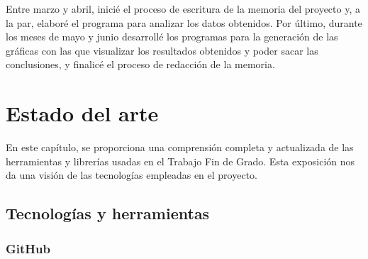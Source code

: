 \documentclass[a4paper, 12pt]{book}
\begin{document}
Entre marzo y abril, inicié el proceso de escritura de la memoria del proyecto y, a la par, elaboré el programa para analizar los datos obtenidos. 
Por último, durante los meses de mayo y junio desarrollé los programas para la generación de las gráficas con las que visualizar los resultados obtenidos y poder sacar las conclusiones, y finalicé el proceso de redacción de la memoria. 


\cleardoublepage
\chapter{Estado del arte}
\label{chap:estado}

En este capítulo, se proporciona una comprensión completa y actualizada de las herramientas y librerías usadas en el Trabajo Fin de Grado.
Esta exposición nos da una visión de las tecnologías empleadas en el proyecto.

\section{Tecnologías y herramientas} %
\label{sec:tecnologías y herramienta}

\subsection{GitHub} %
\label{sec:github} %
\end{document}
